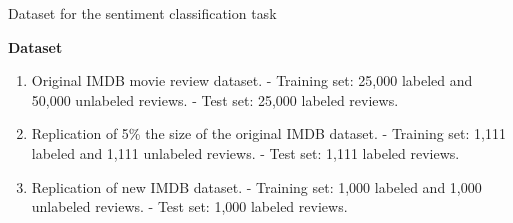 \documentclass[aspectratio=169,xcolor=dvipsnames]{beamer}
\begin{document}

\begin{frame}{Dataset for the sentiment classification task}
    \tableofcontents

    \textbf{Dataset}
    \begin{enumerate}
        \item Original IMDB  movie review dataset.\break 
            - Training set: 25,000 labeled and 50,000 unlabeled reviews.\break 
            - Test set: 25,000 labeled reviews.\break
            
         \item  Replication of 5\% the size of the original IMDB dataset.\break 
            - Training set: 1,111 labeled and 1,111 unlabeled reviews.\break 
            - Test set: 1,111 labeled reviews.\break
            
        \item Replication of new IMDB dataset.\break 
            - Training set: 1,000 labeled and 1,000 unlabeled reviews.\break 
            - Test set: 1,000 labeled reviews.\break
        \end{enumerate}
\end{frame}



\end{document}
